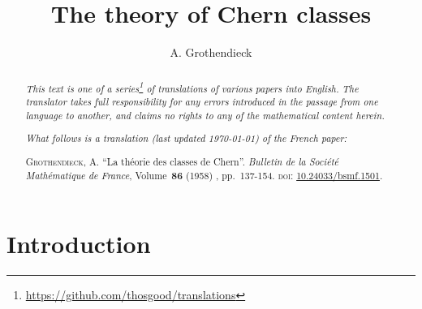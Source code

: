 \documentclass{article}
\theoremstyle{plain}
\theoremstyle{definition}
\begin{document}
\renewcommand{\abstractname}{Translator's note.}

\title{The theory of Chern classes}
\author{A. Grothendieck}
\date{}
\maketitle

\begin{abstract}
  \renewcommand*{\thefootnote}{\fnsymbol{footnote}}
  \emph{This text is one of a series\footnote{\url{https://github.com/thosgood/translations}} of translations of various papers into English.}
  \emph{The translator takes full responsibility for any errors introduced in the passage from one language to another, and claims no rights to any of the mathematical content herein.}
  
  \emph{What follows is a translation (last updated \today) of the French paper:}

  \medskip\noindent
  \textsc{Grothendieck, A.}
  ``La th\'{e}orie des classes de Chern''.
  \emph{Bulletin de la Soci\'{e}t\'{e} Math\'{e}matique de France}, Volume~\textbf{86} (1958) , pp.~137-154.
  \textsc{doi}: \href{https://www.doi.org/10.24033/bsmf.1501}{10.24033/bsmf.1501}.
\end{abstract}

\setcounter{footnote}{0}

\tableofcontents



\bigskip\bigskip


\section*{Introduction}
\end{document}
